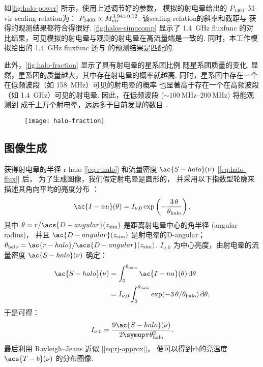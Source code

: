 如\autoref{fig:halo-power} 所示，使用上述调节好的参数，
模拟的射电晕给出的 $P_{1400}$--\ac{M-vir} \ac{scaling-relation}为：
$P_{1400} \propto M_{\mathrm{vir}}^{3.94 \pm 0.12}$.
该\ac{scaling-relation}的斜率和截距与 
获得的观测结果都符合得很好.
\autoref{fig:halos-simucomp} 显示了 \SI{1.4}{\GHz} \ac{fluxfunc}
的对比结果，可见模拟的射电晕与观测的射电晕在高流量端是一致的.
同时，本工作模拟给出的 \SI{1.4}{\GHz} \ac{fluxfunc}
还与  的预测结果是匹配的.

此外，\autoref{fig:halo-fraction} 显示了具有射电晕的星系团比例
随星系团质量的变化.
显然，星系团的质量越大，其中存在射电晕的概率就越高.
同时，星系团中存在一个在低频波段（如 \SI{158}{\MHz}）可见的射电晕的概率
也显著高于存在一个在高频波段（如 \SI{1.4}{\GHz}）可见的射电晕.
因此，在低频波段 ($\sim \SIrange{100}{200}{\MHz}$) 将能观测到
成千上万个射电晕，远远多于目前发现的数目 \cite{cassano2012,cassano2015}.

\begin{figure}[htp]
  \centering
  \texttt{[image: halo-fraction]}
  \label{fig:halo-fraction}
\end{figure}

\subsection{图像生成}
\label{sec:halo-maps}

获得射电晕的半径 \ac{r-halo} [\autoref{eq:r-halo}]
和流量密度 $\ac{S-halo}(\nu)$ [\autoref{eq:halo-flux}] 后，
为了生成图像，我们假定射电晕是圆形的，
并采用以下指数型轮廓来描述其角向平均的亮度分布 \cite{murgia2009}：
\begin{equation}
  \label{eq:halo-profile}
  \ac{I-nu}(\theta) =
    I_{\nu,0} \exp\left( -\frac{3\,\theta}{\theta_{\R{halo}}} \right) ,
\end{equation}
其中
$\theta = r / \acs{D-angular}(z_{\R{sim}})$ 是距离射电晕中心的角半径
(angular radius)，
并且 $\ac{D-angular}(z_{\R{sim}})$ 是射电晕的\acl{D-angular}；
$\theta_{\R{halo}} = \ac{r-halo} / \acs{D-angular}(z_{\R{sim}})$.
$I_{\nu,0}$ 为中心亮度，由射电晕的流量密度 $\ac{S-halo}(\nu)$ 确定：
\begin{align}
  \ac{S-halo}(\nu)
    & = \int_0^{\theta_{\R{halo}}} \ac{I-nu}(\theta) \,\D{\theta} \\
    & = I_{\nu,0} \int_0^{\theta_{\R{halo}}}
        \exp( -3\,\theta / \theta_{\R{halo}} ) \,\D{\theta} ,
\end{align}
于是可得：
\begin{equation}
  I_{\nu,0} = \frac{9 \ac{S-halo}(\nu)}{2\Cpi \theta^2_{\R{halo}}} .
\end{equation}
最后利用 Rayleigh--Jeans 近似 [\autoref{eq:rj-approx}]，
便可以得到\ac{rh}的亮温度 $\acs{T-b}(\nu)$ 的分布图像.

